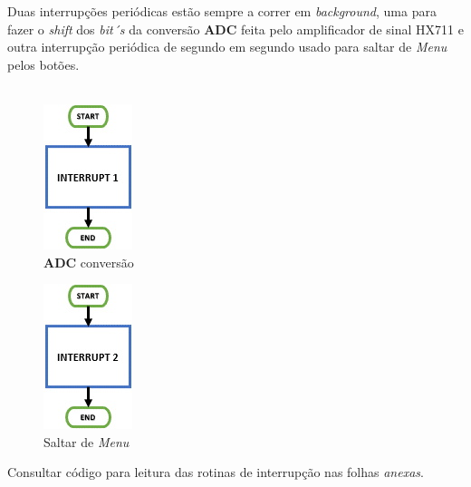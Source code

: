 Duas interrupções periódicas estão sempre a correr em \textit{background}, uma para fazer o \textit{shift} dos \textit{bit´s} da conversão \textbf{ADC} feita pelo amplificador de sinal HX711 e outra interrupção periódica de segundo em segundo usado para saltar de \textit{Menu} pelos botões.
\\
\\
\begin{minipage}{\linewidth}
\begin{minipage}{.5\linewidth}
\begin{figure}[H]
	\centering
	\includegraphics[scale=0.7]{./image/PESTA/flowchart/Interrupt_1.jpg}
	\caption{\textbf{ADC} conversão}
	\label{Interrupt_1}
\end{figure}
\end{minipage}
\begin{minipage}{.5\linewidth}
\begin{figure}[H]
	\centering
	\includegraphics[scale=0.7]{./image/PESTA/flowchart/Interrupt_2.jpg}
	\caption{Saltar de \textit{Menu}}
	\label{Interrupt_2}
\end{figure}
\end{minipage}
\end{minipage}
Consultar código para leitura das rotinas de interrupção nas folhas \textit{anexas}.
\\
\\
